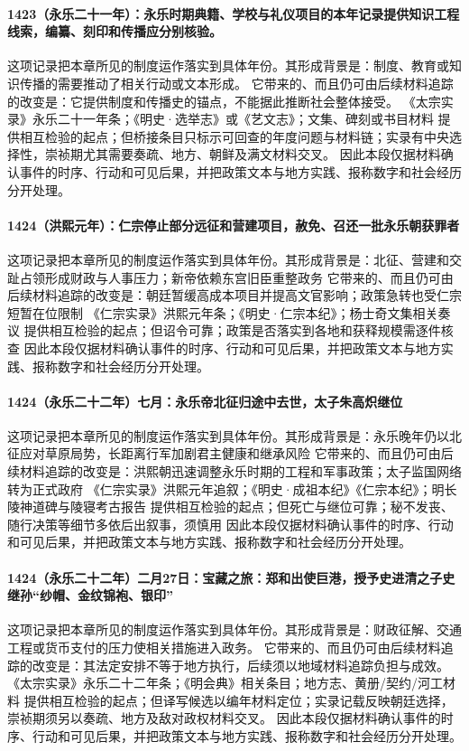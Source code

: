 \paragraph{1423（永乐二十一年）：永乐时期典籍、学校与礼仪项目的本年记录提供知识工程线索，编纂、刻印和传播应分别核验。} 这项记录把本章所见的制度运作落实到具体年份。其形成背景是：制度、教育或知识传播的需要推动了相关行动或文本形成。 它带来的、而且仍可由后续材料追踪的改变是：它提供制度和传播史的锚点，不能据此推断社会整体接受。 《太宗实录》永乐二十一年条；《明史·选举志》或《艺文志》；文集、碑刻或书目材料 提供相互检验的起点；但桥接条目只标示可回查的年度问题与材料链；实录有中央选择性，崇祯期尤其需要奏疏、地方、朝鲜及满文材料交叉。 因此本段仅据材料确认事件的时序、行动和可见后果，并把政策文本与地方实践、报称数字和社会经历分开处理。

\paragraph{1424（洪熙元年）：仁宗停止部分远征和营建项目，赦免、召还一批永乐朝获罪者} 这项记录把本章所见的制度运作落实到具体年份。其形成背景是：北征、营建和交趾占领形成财政与人事压力；新帝依赖东宫旧臣重整政务 它带来的、而且仍可由后续材料追踪的改变是：朝廷暂缓高成本项目并提高文官影响；政策急转也受仁宗短暂在位限制 《仁宗实录》洪熙元年条；《明史·仁宗本纪》；杨士奇文集相关奏议 提供相互检验的起点；但诏令可靠；政策是否落实到各地和获释规模需逐件核查 因此本段仅据材料确认事件的时序、行动和可见后果，并把政策文本与地方实践、报称数字和社会经历分开处理。

\paragraph{1424（永乐二十二年）七月：永乐帝北征归途中去世，太子朱高炽继位} 这项记录把本章所见的制度运作落实到具体年份。其形成背景是：永乐晚年仍以北征应对草原局势，长距离行军加剧君主健康和继承风险 它带来的、而且仍可由后续材料追踪的改变是：洪熙朝迅速调整永乐时期的工程和军事政策；太子监国网络转为正式政府 《仁宗实录》洪熙元年追叙；《明史·成祖本纪》《仁宗本纪》；明长陵神道碑与陵寝考古报告 提供相互检验的起点；但死亡与继位可靠；秘不发丧、随行决策等细节多依后出叙事，须慎用 因此本段仅据材料确认事件的时序、行动和可见后果，并把政策文本与地方实践、报称数字和社会经历分开处理。

\paragraph{1424（永乐二十二年）二月27日：宝藏之旅：郑和出使巨港，授予史进清之子史继孙“纱帽、金纹锦袍、银印”} 这项记录把本章所见的制度运作落实到具体年份。其形成背景是：财政征解、交通工程或货币支付的压力使相关措施进入政务。 它带来的、而且仍可由后续材料追踪的改变是：其法定安排不等于地方执行，后续须以地域材料追踪负担与成效。 《太宗实录》永乐二十二年条；《明会典》相关条目；地方志、黄册/契约/河工材料 提供相互检验的起点；但译写候选以编年材料定位；实录记载反映朝廷选择，崇祯期须另以奏疏、地方及敌对政权材料交叉。 因此本段仅据材料确认事件的时序、行动和可见后果，并把政策文本与地方实践、报称数字和社会经历分开处理。

